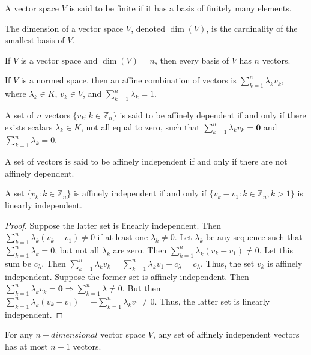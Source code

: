 \documentclass[crop=false,class=book]{standalone}
\begin{document}
\begin{definition}
A vector space $V$ is said to be finite if it has a basis of finitely many elements.
\end{definition}
\begin{definition}
The dimension of a vector space $V$, denoted $\dim(V)$, is the cardinality of the smallest basis of $V$.
\end{definition}
\begin{theorem}
If $V$ is a vector space and $\dim(V)=n$, then every basis of $V$ has $n$ vectors.
\end{theorem}
\begin{definition}
If $V$ is a normed space, then an affine combination of vectors is $\sum_{k=1}^{n} \lambda_k v_k$, where $\lambda_k \in K$, $v_k \in V$, and $\sum_{k=1}^{n} \lambda_k = 1$.
\end{definition}
\begin{definition}
A set of $n$ vectors $\{v_k:k\in \mathbb{Z}_n\}$ is said to be affinely dependent if and only if there exists scalars $\lambda_k \in K$, not all equal to zero, such that $\sum_{k=1}^{n} \lambda_k v_k = \mathbf{0}$ and $\sum_{k=1}^{n} \lambda_k = 0$.
\end{definition}
\begin{definition}
A set of vectors is said to be affinely independent if and only if there are not affinely dependent.
\end{definition}
\begin{theorem}
A set $\{v_k:k\in \mathbb{Z}_n\}$ is affinely independent if and only if $\{v_k-v_1:k\in \mathbb{Z}_n, k>1\}$ is linearly independent.
\end{theorem}
\begin{proof}
Suppose the latter set is linearly independent. Then $\sum_{k=1}^{n} \lambda_k(v_k-v_1) \ne 0$ if at least one $\lambda_k \ne 0$. Let $\lambda_k$ be any sequence such that $\sum_{k=1}^{n} \lambda_k = 0$, but not all $\lambda_k$ are zero. Then $\sum_{k=1}^{n} \lambda_k(v_k-v_1)\ne 0$. Let this sum be $c_{\lambda}$. Then $\sum_{k=1}^{n} \lambda_k v_k = \sum_{k=1}^{n} \lambda_k v_1 + c_\lambda = c_{\lambda}$. Thus, the set $v_k$ is affinely independent. Suppose the former set is affinely independent. Then $\sum_{k=1}^{n} \lambda_k v_k = \mathbf{0} \Rightarrow \sum_{k=1}^{n} \lambda \ne 0$. But then $\sum_{k=1}^{n}\lambda_k (v_k-v_1) = - \sum_{k=1}^{n} \lambda_k v_1 \ne 0$. Thus, the latter set is linearly independent.
\end{proof}
\begin{corollary}
For any $n-dimensional$ vector space $V$, any set of affinely independent vectors has at most $n+1$ vectors.
\end{corollary}
\end{document}
